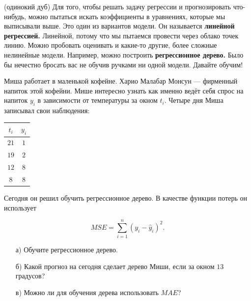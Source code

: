 \documentclass[12pt, a4paper, oneside]{article}
\theoremstyle{plain} %
\theoremstyle{definition}
\newcommand{\indef}[1]{\textbf{ \color{green} #1}}
\begin{document}
\begin{problem}{(одинокий дуб)}
Для того, чтобы решать задачу регрессии и прогнозировать что-нибудь, можно пытаться искать коэффициенты в уравнениях, которые мы выписывали выше. Это один из вариантов модели. Он называется \indef{линейной регрессией.} Линейной, потому что мы пытаемся провести через облако точек линию. Можно пробовать оценивать и какие-то другие, более сложные нелинейные модели. Например, можно построить \indef{регрессионное дерево.} Было бы нечестно бросать вас не обучив ручками ни одной модели. Давайте обучим!

Миша работает в маленькой кофейне. Харио Малабар Монсун --- фирменный напиток этой кофейни. Мише интересно узнать как именно ведёт себя спрос на напиток $y_i$ в зависимости от температуры за окном $t_i$. Четыре дня Миша записывал свои наблюдения: 

\begin{center}
	\begin{tabular}{c|c}
		$t_i$ & $y_i$ \\
		\hline
		$21$ &  $1$ \\
		$19$ & $2$ \\
		$12$ & $8$ \\
		$8$ & $8$ \\
	\end{tabular}
\end{center}

Сегодня он решил обучить регрессионное дерево. В качестве функции потерь он использует 

$$ 
MSE = \sum_{i=1}^n (y_i - \hat y_i)^2. 
$$

\begin{enumerate}
	\item[а)] Обучите регрессионное дерево.
	\item[б)] Какой прогноз на сегодня сделает дерево Миши, если за окном $13$ градусов? 
	\item[в)] Можно ли для обучения дерева использовать $MAE$?
\end{enumerate}
\end{problem} 
\end{document}
